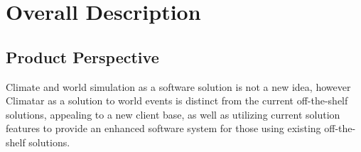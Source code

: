 \documentclass[]{article}
\begin{document}


\section{Overall Description}
\label{sec:overall_description}
\subsection{Product Perspective}
\label{sub:product_perspective}

Climate and world simulation as a software solution is not a new idea, however Climatar as a solution to world events is distinct from the current off-the-shelf solutions, appealing to a new client base, as well as utilizing current solution features to provide an enhanced software system for those using existing off-the-shelf solutions.
\end{document}
